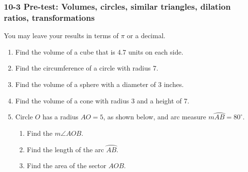 \documentclass[12pt, twoside]{article}
\begin{document}
\subsubsection*{10-3 Pre-test: Volumes, circles, similar triangles, dilation ratios, transformations}
You may leave your results in terms of $\pi$ or a decimal.

 \begin{enumerate}

      \item Find the volume of a cube that is 4.7 units on each side. \vspace{1.5cm}
      \item Find the circumference of a circle with radius 7. \vspace{1.5cm}
      \item Find the volume of a sphere with a diameter of 3 inches. \vspace{1.5cm}
      \item Find the volume of a cone with radius 3 and a height of 7. \vspace{1.5cm}

      \item Circle $O$ has a radius $AO=5$, as shown below, and arc measure $m \wideparen{AB}=80^\circ$.
            \begin{center}
          \end{center}
          \begin{enumerate}
            \item Find the $m \angle AOB$. \vspace{1.5cm}
            \item Find the length of the arc $\wideparen{AB}$. \vspace{1.5cm}
            \item Find the area of the sector $AOB$. %
          \end{enumerate}
\newpage


\end{enumerate}
\end{document}
